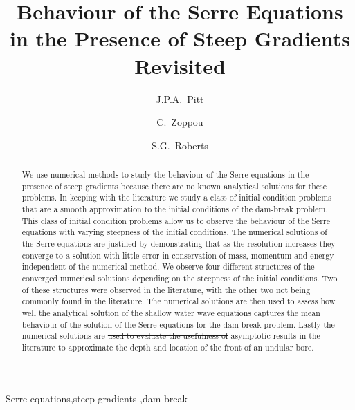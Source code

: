 \documentclass[times]{elsarticle}
\providecommand{\DIFadd}[1]{{\protect\color{blue}\uwave{#1}}} %
\providecommand{\DIFdel}[1]{{\protect\color{red}\sout{#1}}}                      %
\providecommand{\DIFaddbegin}{} %
\providecommand{\DIFaddend}{} %
\providecommand{\DIFdelbegin}{} %
\providecommand{\DIFdelend}{} %
\begin{document}
\title{Behaviour of the Serre Equations in the Presence of Steep Gradients Revisited}

\author[ANU]{J.P.A.~Pitt}
\author[ANU]{C.~Zoppou}
\author[ANU]{S.G.~Roberts}

\address[ANU]{Mathematical Sciences Institute, Australian National University, Canberra, ACT 0200, Australia}
 \begin{abstract}
 We use numerical methods to study the \DIFaddbegin \DIFadd{short term }\DIFaddend behaviour of the Serre equations in the presence of steep gradients because there are no known analytical solutions for these problems. In keeping with the literature we study a class of initial condition problems that are a smooth approximation to the initial conditions of the dam-break problem. This class of initial condition problems allow us to observe the behaviour of the Serre equations with varying steepness of the initial conditions. The numerical solutions of the Serre equations are justified by demonstrating that as the resolution increases they converge to a solution with little error in conservation of mass, momentum and energy independent of the numerical method. We observe \DIFaddbegin \DIFadd{and justify }\DIFaddend four different structures of the converged numerical solutions depending on the steepness of the initial conditions. Two of these structures were observed in the literature, with the other two not being commonly found in the literature. The numerical solutions are then used to assess how well the analytical solution of the shallow water wave equations captures the mean behaviour of the solution of the Serre equations for the dam-break problem. Lastly the numerical solutions are \DIFdelbegin \DIFdel{used to evaluate the usefulness of }\DIFdelend \DIFaddbegin \DIFadd{compared to }\DIFaddend asymptotic results in the literature to approximate the depth and location of the front of an undular bore.
 \end{abstract}	

  \begin{keyword}
  	Serre equations\sep steep gradients \sep dam break
  \end{keyword}

 \maketitle
\linenumbers
\end{document}
